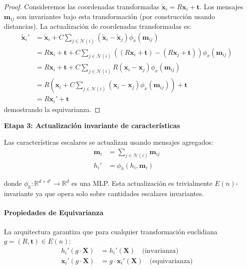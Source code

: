 \begin{proof}
Consideremos las coordenadas transformadas $\tilde{\mathbf{x}}_i = R\mathbf{x}_i + \mathbf{t}$. Los mensajes $\mathbf{m}_{ij}$ son invariantes bajo esta transformación (por construcción usando distancias). La actualización de coordenadas transformadas es:
\begin{align}
\tilde{\mathbf{x}}_i' &= \tilde{\mathbf{x}}_i + C \sum_{j \in \mathcal{N}(i)} (\tilde{\mathbf{x}}_i - \tilde{\mathbf{x}}_j) \phi_x(\mathbf{m}_{ij}) \\
&= R\mathbf{x}_i + \mathbf{t} + C \sum_{j \in \mathcal{N}(i)} ((R\mathbf{x}_i + \mathbf{t}) - (R\mathbf{x}_j + \mathbf{t})) \phi_x(\mathbf{m}_{ij}) \\
&= R\mathbf{x}_i + \mathbf{t} + C \sum_{j \in \mathcal{N}(i)} R(\mathbf{x}_i - \mathbf{x}_j) \phi_x(\mathbf{m}_{ij}) \\
&= R\left(\mathbf{x}_i + C \sum_{j \in \mathcal{N}(i)} (\mathbf{x}_i - \mathbf{x}_j) \phi_x(\mathbf{m}_{ij})\right) + \mathbf{t} \\
&= R\mathbf{x}_i' + \mathbf{t}
\end{align}
demostrando la equivarianza.
\end{proof}

\textbf{Etapa 3: Actualización invariante de características}

Las características escalares se actualizan usando mensajes agregados:
\begin{align}
\mathbf{m}_i &= \sum_{j \in \mathcal{N}(i)} \mathbf{m}_{ij} \label{eq:egnn_aggregate}\\
h_i' &= \phi_h(h_i, \mathbf{m}_i) \label{eq:egnn_feature_update}
\end{align}

donde $\phi_h: \mathbb{R}^{d + d'} \to \mathbb{R}^d$ es una MLP. Esta actualización es trivialmente $E(n)$-invariante ya que opera solo sobre cantidades escalares invariantes.

\paragraph{Propiedades de Equivarianza}

La arquitectura garantiza que para cualquier transformación euclidiana $g = (R, \mathbf{t}) \in E(n)$:
\begin{align}
h_i'(g \cdot \mathbf{X}) &= h_i'(\mathbf{X}) \quad \text{(invarianza)} \\
\mathbf{x}_i'(g \cdot \mathbf{X}) &= g \cdot \mathbf{x}_i'(\mathbf{X}) \quad \text{(equivarianza)}
\end{align}

